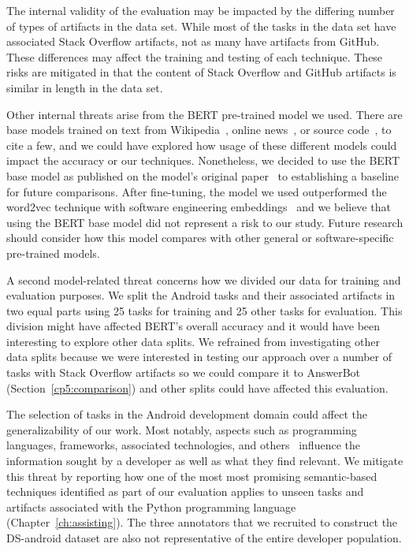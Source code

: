 The internal validity of the evaluation
may be impacted by the differing number of
types of artifacts in the data set.
While most of the tasks in the data set have
associated 
 Stack Overflow artifacts, not as many have artifacts from GitHub.
These differences may affect the training
and testing of each technique. These
risks are mitigated in that 
 the content of Stack Overflow and GitHub artifacts is similar in length in the data set.



Other internal threats arise from the BERT pre-trained model we used. 
There are base models trained on text from Wikipedia~\cite{Devlin2018Bert},  online news~\cite{peters2018elmo}, 
or source code~\cite{feng2020-codebert}, to  cite a few,
and we could have explored how usage of these different models could impact the accuracy or our 
techniques. Nonetheless, we decided to use 
the BERT base model as published on the model's original paper~\cite{Devlin2018Bert}
to establishing a baseline for future comparisons. 
After fine-tuning, the model we used outperformed 
the word2vec technique with software engineering embeddings~\cite{Efstathiou2018}
and we believe that using the BERT base model did not represent a risk to our study.
Future research should consider how this model compares with other 
general or software-specific pre-trained models.



A second model-related threat concerns how we
divided our data for training and evaluation purposes. 
We split the Android tasks and their associated artifacts in two equal parts using 
25 tasks for training and 25 other tasks for evaluation.
This division might have affected BERT's overall accuracy and it would have been interesting 
to explore other data splits. 
We refrained from investigating other data splits 
because we were interested in testing our approach over 
a number of tasks with Stack Overflow artifacts
so we could compare it to AnswerBot (Section~\ref{cp5:comparison})
 and other splits 
could have affected this evaluation.





The selection of tasks in the Android development domain could 
affect the generalizability of our work. Most notably, 
aspects such as programming languages, frameworks, associated technologies, and others~\cite{baltes2019}
influence the information sought by a developer as well as what they find relevant.
We mitigate this threat by reporting how one of the most 
most promising semantic-based techniques identified as part of our evaluation applies 
to unseen tasks and artifacts associated with the Python programming language (Chapter~\ref{ch:assisting}). 
The three annotators that we recruited to construct the \acs{DS-android} dataset are also not representative 
of the entire developer population. 



